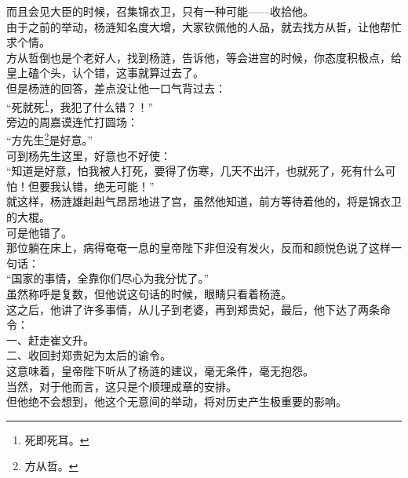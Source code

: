 \begin{multicols}{\theparacolNo}
而且会见大臣的时候，召集锦衣卫，只有一种可能——收拾他。\\

由于之前的举动，杨涟知名度大增，大家钦佩他的人品，就去找方从哲，让他帮忙求个情。\\

方从哲倒也是个老好人，找到杨涟，告诉他，等会进宫的时候，你态度积极点，给皇上磕个头，认个错，这事就算过去了。\\

但是杨涟的回答，差点没让他一口气背过去：\\

“死就死\footnote{死即死耳。}，我犯了什么错？！”\\

旁边的周嘉谟连忙打圆场：\\

“方先生\footnote{方从哲。}是好意。”\\

可到杨先生这里，好意也不好使：\\

“知道是好意，怕我被人打死，要得了伤寒，几天不出汗，也就死了，死有什么可怕！但要我认错，绝无可能！”\\

就这样，杨涟雄赳赳气昂昂地进了宫，虽然他知道，前方等待着他的，将是锦衣卫的大棍。\\

可是他错了。\\

那位躺在床上，病得奄奄一息的皇帝陛下非但没有发火，反而和颜悦色说了这样一句话：\\

“国家的事情，全靠你们尽心为我分忧了。”\\

虽然称呼是复数，但他说这句话的时候，眼睛只看着杨涟。\\

这之后，他讲了许多事情，从儿子到老婆，再到郑贵妃，最后，他下达了两条命令：\\

一、赶走崔文升。\\

二、收回封郑贵妃为太后的谕令。\\

这意味着，皇帝陛下听从了杨涟的建议，毫无条件，毫无抱怨。\\

当然，对于他而言，这只是个顺理成章的安排。\\

但他绝不会想到，他这个无意间的举动，将对历史产生极重要的影响。\\


\end{multicols}
